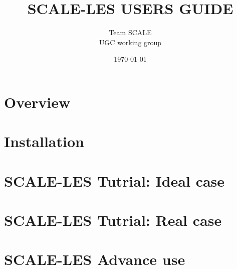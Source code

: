 \documentclass[a4paper]{jreport}
\title{{\Huge SCALE-LES USERS GUIDE \\
   \vspace{1cm}{\Large  SCALE Version 0.2.0 (SCALE-LES Version: 4.2.0) 版} }}
\author{\Large Team SCALE\\ UGC working group}
\date{\today}
\begin{document}
\maketitle
\tableofcontents

\chapter{Overview}

%

\chapter{Installation}


\chapter{SCALE-LES Tutrial: Ideal case}


\chapter{SCALE-LES Tutrial: Real case}







\chapter{SCALE-LES Advance use}









\appendix




\end{document}
